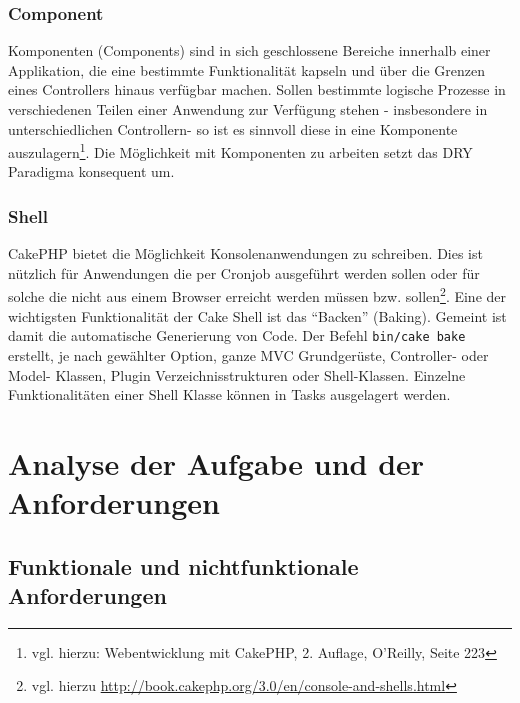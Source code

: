 	\subsubsection{Component}
	Komponenten (Components) sind in sich geschlossene Bereiche innerhalb einer Applikation, die eine bestimmte Funktionalität kapseln und über die Grenzen eines Controllers hinaus verfügbar machen. Sollen bestimmte logische Prozesse in verschiedenen Teilen einer Anwendung zur Verfügung stehen - insbesondere in unterschiedlichen Controllern- so ist es sinnvoll diese in eine Komponente auszulagern\footnote{vgl. hierzu: Webentwicklung mit CakePHP, 2. Auflage, O'Reilly, Seite 223}.
	Die Möglichkeit mit Komponenten zu arbeiten setzt das DRY Paradigma konsequent um.
	
	\subsubsection{Shell}	%
	CakePHP bietet die Möglichkeit Konsolenanwendungen zu schreiben. Dies ist nützlich für Anwendungen die per Cronjob ausgeführt werden sollen oder für solche die nicht aus einem Browser erreicht werden müssen bzw. sollen\footnote{vgl. hierzu \url{http://book.cakephp.org/3.0/en/console-and-shells.html}}. 
	Eine der wichtigsten Funktionalität der Cake Shell ist das \enquote{Backen} (Baking). Gemeint ist damit die automatische Generierung von Code. Der Befehl \texttt{bin/cake bake} erstellt, je nach gewählter Option, ganze MVC Grundgerüste, Controller- oder Model- Klassen, Plugin Verzeichnisstrukturen oder Shell-Klassen. Einzelne Funktionalitäten einer Shell Klasse können in Tasks ausgelagert werden.  
	
	
	\section{Analyse der Aufgabe und der Anforderungen}
	
	\subsection{Funktionale und nichtfunktionale Anforderungen}	
		
